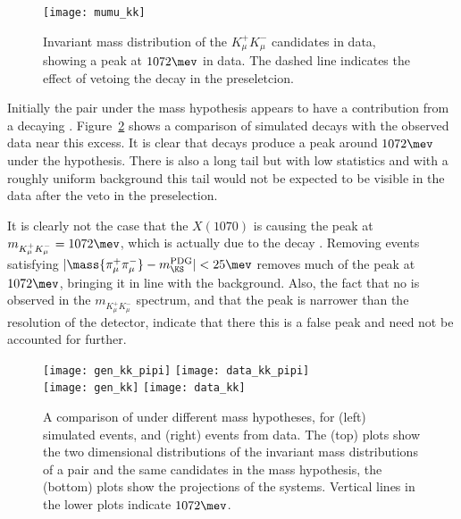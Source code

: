 \begin{figure}
  \begin{center}
    \texttt{[image: mumu\_kk]}
    \caption[Invariant mass of the \mumu distribution under the \kk mass hypotheses]
    {
      Invariant mass distribution of the $K_\mu^+K_\mu^-$ candidates in data, showing a peak at
      \approx$1072\mev$ in data.
      The dashed line indicates the effect of vetoing the decay
      \decay{\KS}{\pip\pim} in the preseletcion.
    }
    \label{fig:x1070}
  \end{center}
\end{figure}


Initially the \mumu pair under the \kk mass hypothesis appears to have a contribution from a
decaying \xtsvty.
Figure~\ref{fig:db:x1070:2d} shows a comparison of simulated \decay{\KS}{\pipi} decays with the
observed data near this excess.
It is clear that \decay{\KS}{\pipi} decays produce a peak around $1072\mev$ under the \kk
hypothesis.
There is also a long tail but with low statistics and with a roughly uniform
background this tail would not be expected to be visible in the data after the \KS veto in the
preselection.

It is clearly not the case that the $X(1070)$ is causing the peak at $m_{K^+_\mu
K^-_\mu}=1072\mev$, which is actually due to the decay \decay{\KS}{\pipi}.
Removing events satisfying $|\mass{\pi_\mu^+\pi_\mu^-}-m_{\KS}^\mathrm{PDG}|<25\mev$ removes much
of the peak at $1072\mev$, bringing it in line with the background.
Also, the fact that no \decay{\phi}{\kk} is observed in the $m_{K^+_\mu K^-_\mu}$ spectrum, and
that the peak is narrower than the resolution of the \lhcb detector,
indicate that there this is a false peak and need not be accounted for further.

\begin{figure}
  \begin{center}
    \texttt{[image: gen\_kk\_pipi]}
    \texttt{[image: data\_kk\_pipi]}\\
    \texttt{[image: gen\_kk]}
    \texttt{[image: data\_kk]}
    \caption[Analysis of the \decay{\KS}{\pipi} background under the \kk mass hypothesis]
    {
      A comparison of \decay{\KS}{\pi\pi} under different mass hypotheses, for
      (left) simulated events, and
      (right) events from data.
      The (top) plots show the two dimensional distributions of the invariant mass distributions of
      a \pipi pair and the same candidates in the \kk mass hypothesis, the (bottom)
      plots show the projections of the \kk systems.
      Vertical lines in the lower plots indicate $1072\mev$.
    }
    \label{fig:db:x1070:2d}
  \end{center}
\end{figure}


